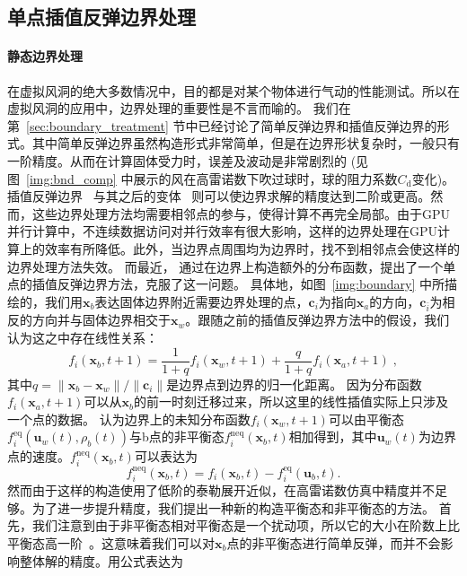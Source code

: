 \subsection{单点插值反弹边界处理}
\label{sec:sig23_boundary}
\paragraph{静态边界处理}
在虚拟风洞的绝大多数情况中，目的都是对某个物体进行气动的性能测试。所以在虚拟风洞的应用中，边界处理的重要性是不言而喻的。
我们在第~\ref{sec:boundary_treatment} 节中已经讨论了简单反弹边界和插值反弹边界的形式。其中简单反弹边界虽然构造形式非常简单，但是在边界形状复杂时，一般只有一阶精度。从而在计算固体受力时，误差及波动是非常剧烈的 (见图~\ref{img:bnd_comp} 中展示的风在高雷诺数下吹过球时，球的阻力系数$C_\text{d}$变化)。
插值反弹边界~\citep{Bouzidi-2001} 与其之后的变体~\citep{Yu-2003, Ginzburg-2003, Chun-2007} 则可以使边界求解的精度达到二阶或更高。然而，这些边界处理方法均需要相邻点的参与，使得计算不再完全局部。由于GPU并行计算中，不连续数据访问对并行效率有很大影响，这样的边界处理在GPU计算上的效率有所降低。此外，当边界点周围均为边界时，找不到相邻点会使这样的边界处理方法失效。
而最近，\citet{Tao-2018-b} 通过在边界上构造额外的分布函数，提出了一个单点的插值反弹边界方法，克服了这一问题。
具体地，如图~\ref{img:boundary} 中所描绘的，我们用$\bm{x}_{b}$表达固体边界附近需要边界处理的点，$\bm{c}_{i}$为指向$\bm{x}_{a}$的方向，$\bm{c}_{\bar{i}}$为相反的方向并与固体边界相交于$\bm{x}_{w}$。跟随之前的插值反弹边界方法中的假设，我们认为这之中存在线性关系：
\begin{equation}
f_i(\bm{x}_b, t\!+\!1) = \frac{1}{1+q}f_{i}(\bm{x}_w, t\!+\!1)+ \frac{q}{1+q}f_{i}(\bm{x}_a, t\!+\!1) \;,
\end{equation}
其中$q=\|\bm{x}_b - \bm{x}_w\|/\|\bm{c}_i\|$是边界点到边界的归一化距离。
因为分布函数$f_{i}(\bm{x}_a, t+1)$可以从$\bm{x}_b$的前一时刻迁移过来，所以这里的线性插值实际上只涉及一个点的数据。
\citet{Tao-2018-b} 认为边界上的未知分布函数$f_{i}(\bm{x}_w, t\!+\!1)$可以由平衡态$f_{i}^\text{eq}(\bm{u}_w(t), \rho_b(t))$与b点的非平衡态$f_{i}^\text{neq}(\bm{x}_b, t)$相加得到，其中$\bm{u}_w(t)$为边界点的速度。$f_{i}^\text{neq}(\bm{x}_b, t)$可以表达为
\begin{equation}
f_{i}^\text{neq}(\bm{x}_b, t) = f_{i}(\bm{x}_b, t) - f_{i}^\text{eq}(\bm{u}_b, t).
\end{equation}
然而由于这样的构造使用了低阶的泰勒展开近似，在高雷诺数仿真中精度并不足够。为了进一步提升精度，我们提出一种新的构造平衡态和非平衡态的方法。
首先，我们注意到由于非平衡态相对平衡态是一个扰动项，所以它的大小在阶数上比平衡态高一阶~\citep{Chun-2007}。这意味着我们可以对$\bm{x}_b$点的非平衡态进行简单反弹，而并不会影响整体解的精度。用公式表达为
